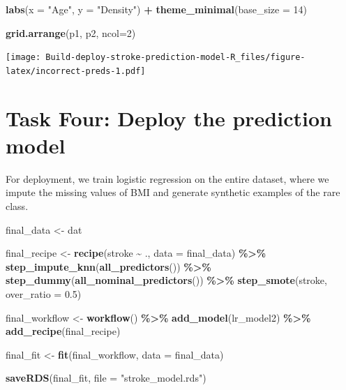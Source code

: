 \documentclass[
]{article}
\newenvironment{Shaded}{\begin{snugshade}}{\end{snugshade}}
\newcommand{\AttributeTok}[1]{\textcolor[rgb]{0.13,0.29,0.53}{#1}}
\newcommand{\DecValTok}[1]{\textcolor[rgb]{0.00,0.00,0.81}{#1}}
\newcommand{\FloatTok}[1]{\textcolor[rgb]{0.00,0.00,0.81}{#1}}
\newcommand{\FunctionTok}[1]{\textcolor[rgb]{0.13,0.29,0.53}{\textbf{#1}}}
\newcommand{\NormalTok}[1]{#1}
\newcommand{\OtherTok}[1]{\textcolor[rgb]{0.56,0.35,0.01}{#1}}
\newcommand{\SpecialCharTok}[1]{\textcolor[rgb]{0.81,0.36,0.00}{\textbf{#1}}}
\newcommand{\StringTok}[1]{\textcolor[rgb]{0.31,0.60,0.02}{#1}}
\begin{document}
\begin{Shaded}
\begin{Highlighting}[]
  \FunctionTok{labs}\NormalTok{(}\AttributeTok{x =} \StringTok{"Age"}\NormalTok{, }\AttributeTok{y =} \StringTok{"Density"}\NormalTok{) }\SpecialCharTok{+}
  \FunctionTok{theme\_minimal}\NormalTok{(}\AttributeTok{base\_size =} \DecValTok{14}\NormalTok{)}

\FunctionTok{grid.arrange}\NormalTok{(p1, p2, }\AttributeTok{ncol=}\DecValTok{2}\NormalTok{)}
\end{Highlighting}
\end{Shaded}

\texttt{[image: Build-deploy-stroke-prediction-model-R\_files/figure-latex/incorrect-preds-1.pdf]}

\section{Task Four: Deploy the prediction
model}\label{task-four-deploy-the-prediction-model}

For deployment, we train logistic regression on the entire dataset,
where we impute the missing values of BMI and generate synthetic
examples of the rare class.

\begin{Shaded}
\begin{Highlighting}[]
\NormalTok{final\_data }\OtherTok{\textless{}{-}}\NormalTok{ dat}

\NormalTok{final\_recipe }\OtherTok{\textless{}{-}} \FunctionTok{recipe}\NormalTok{(stroke }\SpecialCharTok{\textasciitilde{}}\NormalTok{ ., }\AttributeTok{data =}\NormalTok{ final\_data) }\SpecialCharTok{\%\textgreater{}\%}
  \FunctionTok{step\_impute\_knn}\NormalTok{(}\FunctionTok{all\_predictors}\NormalTok{()) }\SpecialCharTok{\%\textgreater{}\%}
  \FunctionTok{step\_dummy}\NormalTok{(}\FunctionTok{all\_nominal\_predictors}\NormalTok{()) }\SpecialCharTok{\%\textgreater{}\%} 
  \FunctionTok{step\_smote}\NormalTok{(stroke, }\AttributeTok{over\_ratio =} \FloatTok{0.5}\NormalTok{)}


\NormalTok{final\_workflow }\OtherTok{\textless{}{-}} \FunctionTok{workflow}\NormalTok{() }\SpecialCharTok{\%\textgreater{}\%} 
  \FunctionTok{add\_model}\NormalTok{(lr\_model2) }\SpecialCharTok{\%\textgreater{}\%} 
  \FunctionTok{add\_recipe}\NormalTok{(final\_recipe)}


\NormalTok{final\_fit }\OtherTok{\textless{}{-}} \FunctionTok{fit}\NormalTok{(final\_workflow, }\AttributeTok{data =}\NormalTok{ final\_data)}

\FunctionTok{saveRDS}\NormalTok{(final\_fit, }\AttributeTok{file =} \StringTok{"stroke\_model.rds"}\NormalTok{)}
\end{Highlighting}
\end{Shaded}
\end{document}

